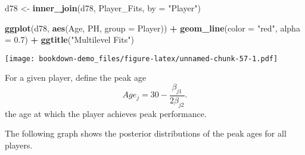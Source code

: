 \documentclass[
]{book}
\newenvironment{Shaded}{\begin{snugshade}}{\end{snugshade}}
\newcommand{\DataTypeTok}[1]{\textcolor[rgb]{0.13,0.29,0.53}{#1}}
\newcommand{\DecValTok}[1]{\textcolor[rgb]{0.00,0.00,0.81}{#1}}
\newcommand{\FloatTok}[1]{\textcolor[rgb]{0.00,0.00,0.81}{#1}}
\newcommand{\KeywordTok}[1]{\textcolor[rgb]{0.13,0.29,0.53}{\textbf{#1}}}
\newcommand{\NormalTok}[1]{#1}
\newcommand{\OperatorTok}[1]{\textcolor[rgb]{0.81,0.36,0.00}{\textbf{#1}}}
\newcommand{\StringTok}[1]{\textcolor[rgb]{0.31,0.60,0.02}{#1}}
\begin{document}
\begin{Shaded}
\begin{Highlighting}[]
\NormalTok{d78 <-}\StringTok{ }\KeywordTok{inner_join}\NormalTok{(d78, Player_Fits, }\DataTypeTok{by =} \StringTok{"Player"}\NormalTok{)}
\end{Highlighting}
\end{Shaded}

\begin{Shaded}
\end{Shaded}

\begin{Shaded}
\begin{Highlighting}[]
\KeywordTok{ggplot}\NormalTok{(d78, }\KeywordTok{aes}\NormalTok{(Age, PH, }\DataTypeTok{group =}\NormalTok{ Player)) }\OperatorTok{+}
\StringTok{  }\KeywordTok{geom_line}\NormalTok{(}\DataTypeTok{color =} \StringTok{"red"}\NormalTok{, }\DataTypeTok{alpha =} \FloatTok{0.7}\NormalTok{) }\OperatorTok{+}
\StringTok{  }\KeywordTok{ggtitle}\NormalTok{(}\StringTok{"Multilevel Fits"}\NormalTok{) }
\end{Highlighting}
\end{Shaded}

\texttt{[image: bookdown-demo\_files/figure-latex/unnamed-chunk-57-1.pdf]}

For a given player, define the peak age
\[
Age_j = 30 - \frac{\beta_{j1}}{2 \beta_{j2}}.
\]
the age at which the player achieves peak performance.

The following graph shows the posterior distributions of the peak ages for all players.
\end{document}
